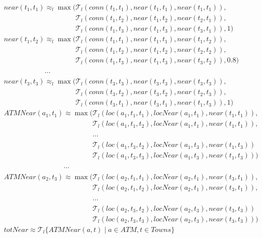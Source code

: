 \documentclass{tlp}
\newcommand{\feq}{\ensuremath{\approx}}
\newcommand{\pretnorm}{\mathcal{T}}
\begin{document}
{\begin{align*}
&near(t_1,t_1) \feq_l \max(\pretnorm_l(conn(t_1,t_1),near(t_1,t_1),near(t_1,t_1)),\\
   &\phantom{near(t_1,t_1) \feq_l \max(}\pretnorm_l(conn(t_1,t_2),near(t_1,t_2),near(t_2,t_1)),\\
   &\phantom{near(t_1,t_1) \feq_l \max(}\pretnorm_l(conn(t_1,t_3),near(t_1,t_3),near(t_3,t_1)),1)\\
&near(t_1,t_2) \feq_l \max(\pretnorm_l(conn(t_1,t_1),near(t_1,t_1),near(t_1,t_2)),\\
   &\phantom{near(t_1,t_2) \feq_l \max(}\pretnorm_l(conn(t_1,t_2),near(t_1,t_2),near(t_2,t_2)),\\
   &\phantom{near(t_1,t_2) \feq_l \max(}\pretnorm_l(conn(t_1,t_3),near(t_1,t_3),near(t_3,t_2)),0.8)\\
   &\phantom{near(t_1,t_2) }\ldots\\
   & near(t_3,t_3) \feq_l \max(\pretnorm_l(conn(t_3,t_3),near(t_3,t_3),near(t_3,t_3)),\\
   &\phantom{near(t_3,t_3) \feq_l \max(}\pretnorm_l(conn(t_3,t_2),near(t_3,t_2),near(t_2,t_3)),\\
   &\phantom{near(t_3,t_3) \feq_l \max(}\pretnorm_l(conn(t_3,t_1),near(t_3,t_1),near(t_1,t_3)),1)\\
&ATMNear(a_1,t_1) \feq \max(\pretnorm_l(loc(a_1,t_1,t_1),locNear(a_1,t_1),near(t_1,t_1)),\\
    &\phantom{ATMNear(a_1,t_1) \feq \max(}\pretnorm_l(loc(a_1,t_1,t_2),locNear(a_1,t_1),near(t_1,t_1)),\\
    &\phantom{ATMNear(a_1,t_1) \feq \max(}\ldots\\
    &\phantom{ATMNear(a_1,t_1) \feq \max(}\pretnorm_l(loc(a_1,t_3,t_2),locNear(a_1,t_3),near(t_1,t_3))\\
    &\phantom{ATMNear(a_1,t_1) \feq \max(}\pretnorm_l(loc(a_1,t_3,t_3),locNear(a_1,t_3),near(t_1,t_3)))\\
    &\phantom{ATMNear(a_1,t_1) }\ldots\\
   &ATMNear(a_2,t_3) \feq \max(\pretnorm_l(loc(a_2,t_1,t_1),locNear(a_2,t_1),near(t_3,t_1)),\\
    &\phantom{ATMNear(a_2,t_3) \feq \max(}\pretnorm_l(loc(a_2,t_1,t_2),locNear(a_2,t_1),near(t_3,t_1)),\\
    &\phantom{ATMNear(a_2,t_3) \feq \max(}\ldots\\
    &\phantom{ATMNear(a_2,t_3) \feq \max(}\pretnorm_l(loc(a_2,t_3,t_2),locNear(a_2,t_3),near(t_3,t_3))\\
    &\phantom{ATMNear(a_2,t_3) \feq \max(}\pretnorm_l(loc(a_2,t_3,t_3),locNear(a_2,t_3),near(t_3,t_3)))\\
   &totNear \feq \pretnorm_l\{ ATMNear(a,t) \mid a \in \mathit{ATM}, t \in Towns \}
\end{align*}}
\end{document}
